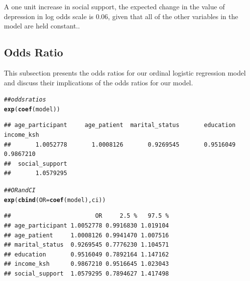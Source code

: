 \documentclass[12pt]{article}\usepackage[]{graphicx}\usepackage[]{xcolor}
\makeatletter
\newcommand{\hlcom}[1]{\textcolor[rgb]{0.678,0.584,0.686}{\textit{#1}}}%
\newcommand{\hlstd}[1]{\textcolor[rgb]{0.345,0.345,0.345}{#1}}%
\newcommand{\hlkwc}[1]{\textcolor[rgb]{0.333,0.667,0.333}{#1}}%
\newcommand{\hlkwd}[1]{\textcolor[rgb]{0.737,0.353,0.396}{\textbf{#1}}}%
\newenvironment{kframe}{%
 \def\at@end@of@kframe{}%
 \ifinner\ifhmode%
  \def\at@end@of@kframe{\end{minipage}}%
  \begin{minipage}{\columnwidth}%
 \fi\fi%
 \def\FrameCommand##1{\hskip\@totalleftmargin \hskip-\fboxsep
 \colorbox{shadecolor}{##1}\hskip-\fboxsep
     \hskip-\linewidth \hskip-\@totalleftmargin \hskip\columnwidth}%
 \MakeFramed {\advance\hsize-\width
   \@totalleftmargin\z@ \linewidth\hsize
   \@setminipage}}%
 {\par\unskip\endMakeFramed%
 \at@end@of@kframe}
\newenvironment{knitrout}{}{} %
\numberwithin{equation}{section}
\numberwithin{figure}{section}
\makeatother
\begin{document}
\noindent A one unit increase in social support, the expected change in the value of depression in log odds scale is 0.06, given that all of the other variables in the model are held constant..\\

\subsection{Odds Ratio}
This subsection presents the odds ratios for our ordinal logistic regression model and discuss their implications of the odds ratios for  our model.
\begin{knitrout}
\color{fgcolor}\begin{kframe}
\begin{alltt}
\hlcom{## odds ratios}
\hlkwd{exp}\hlstd{(}\hlkwd{coef}\hlstd{(model))}
\end{alltt}
\begin{verbatim}
## age_participant     age_patient  marital_status       education      income_ksh 
##       1.0052778       1.0008126       0.9269545       0.9516049       0.9867210 
##  social_support 
##       1.0579295
\end{verbatim}
\begin{alltt}
\hlcom{## OR and CI}
\hlkwd{exp}\hlstd{(}\hlkwd{cbind}\hlstd{(}\hlkwc{OR} \hlstd{=} \hlkwd{coef}\hlstd{(model), ci))}
\end{alltt}
\begin{verbatim}
##                        OR     2.5 %   97.5 %
## age_participant 1.0052778 0.9916830 1.019104
## age_patient     1.0008126 0.9941470 1.007516
## marital_status  0.9269545 0.7776230 1.104571
## education       0.9516049 0.7892164 1.147162
## income_ksh      0.9867210 0.9516645 1.023043
## social_support  1.0579295 0.7894627 1.417498
\end{verbatim}
\end{kframe}
\end{knitrout}
\end{document}
